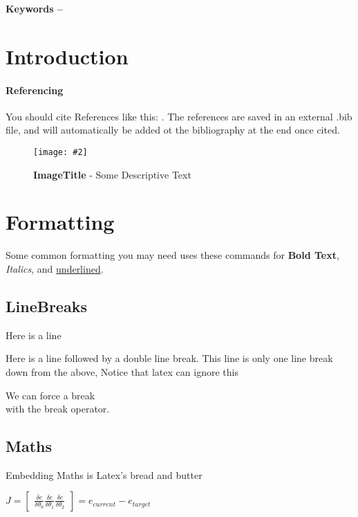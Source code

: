 \documentclass[10pt, a4paper]{article}
\title{\mytitle}
\author{\myauthor\hspace{1em}\\\contact\\Edinburgh Napier University\hspace{0.5em}-\hspace{0.5em}\mymodule}
\date{}
\newcommand{\figuremacro}[5]{
    \begin{figure}[#1]
        \centering
        \texttt{[image: \#2]}
        \caption[#3]{\textbf{#3}#4}
        \label{fig:#2}
    \end{figure}
}
\begin{document}
	\maketitle
	\begin{abstract}
		 The aim of this project is to create a 3D scene using OpenGL and the skills developed in the Computer Graphics module at Edinburgh Napier University. 
	\end{abstract}
    
	\textbf{Keywords -- }{\mykeywords}
	\section{Introduction}
    \paragraph{Referencing}
    You should cite References like this: \cite{Keshav}. The references are saved in an external .bib file, and will automatically be added ot the bibliography at the end once cited.
    
    \figuremacro{h}{placeholder}{ImageTitle}{ - Some Descriptive Text}{1.0}
	
	\section{Formatting}
	Some common formatting you may need uses these commands for \textbf{Bold Text}, \textit{Italics}, and \underline{underlined}.
	\subsection{LineBreaks}
	Here is a line
    
    Here is a line followed by a double line break.
	This line is only one line break down from the above, Notice that latex can ignore this
    
    We can force a break \\ with the break operator.
    
	\subsection{Maths}
    Embedding Maths is Latex's bread and butter    
    
    {\centering \Large \(
        J = \begin{bmatrix}
            \frac{\delta e}{\delta \theta _0}
            \frac{\delta e}{\delta \theta _1}
            \frac{\delta e}{\delta \theta _2}
        \end{bmatrix}
        = e_{current} - e_{target} 
    \)\par}
	
\end{document}
